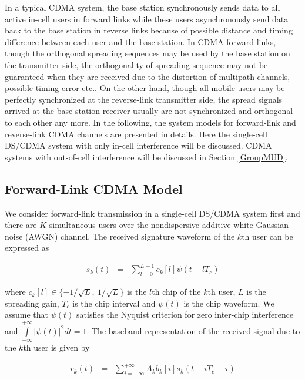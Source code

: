 \documentclass[a4paper,11pt,fleqn]{article}
\begin{document}
In a typical CDMA system, the base station synchronously sends
data to all active in-cell users in forward links while these
users asynchronously send data back to the base station in reverse
links because of possible distance and timing difference between
each user and the base station. In CDMA forward links, though the
orthogonal spreading sequences may be used by the base station on
the transmitter side, the orthogonality of spreading sequence may
not be guaranteed when they are received due to the distortion of
multipath channels, possible timing error etc.. On the other hand,
though all mobile users may be perfectly synchronized at the
reverse-link transmitter side, the spread signals arrived at the
base station receiver usually are not synchronized and orthogonal
to each other any more. In the following, the system models for
forward-link and reverse-link CDMA channels are presented in
details. Here the single-cell DS/CDMA system with only in-cell
interference will be discussed. CDMA systems with out-of-cell
interference will be discussed in Section \ref{GroupMUD}.

\subsection{Forward-Link CDMA Model}

We consider forward-link transmission in a single-cell DS/CDMA
system first and there are $K$ simultaneous users  over the
nondispersive additive white Gaussian noise (AWGN) channel. The
received signature waveform of the $k$th user can be expressed as

\begin{equation}
\begin{array}{rcl}
s_k(t)&=&\sum\limits_{l=0}^{L-1}c_k[l]\psi(t-lT_c)
\end{array}
\end{equation}

\noindent where $c_k[l]\in \{-1/\sqrt{L},\ 1/\sqrt{L}\}$ is the
$l$th chip of the $k$th user, $L$ is the spreading gain, $T_c$ is
the chip interval and $\psi(t)$ is the chip waveform. We assume
that $\psi(t)$ satisfies the Nyquist criterion for zero inter-chip
interference and $\int\limits_{-\infty}^{+\infty}|\psi(t)|^2dt=1$.
The baseband representation of the received signal due to the
$k$th user is given by

\begin{equation}
\begin{array}{rcl}
r_k(t)&=&\sum\limits_{i=-\infty}^{+\infty}A_k b_k[i]
s_k(t-iT_c-\tau)
\end{array}
\end{equation}
\end{document}
